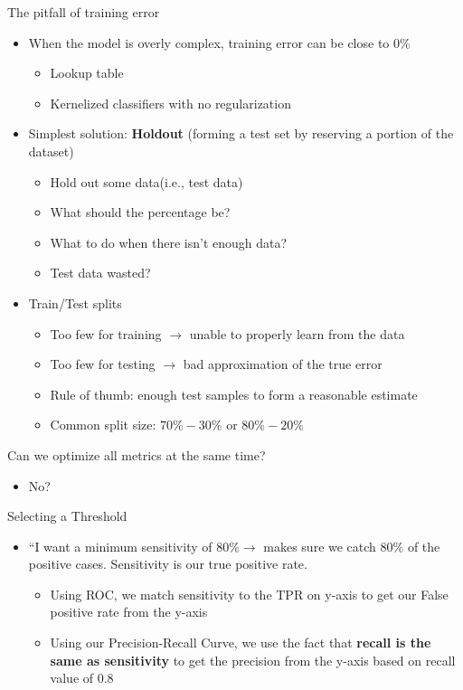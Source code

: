 \documentclass[10pt, oneside]{article}
\begin{document}
The pitfall of training error
\begin{itemize}
    \item When the model is overly complex, training error can be close to 0\%
    \begin{itemize}
        \item Lookup table
        \item Kernelized classifiers with no regularization
    \end{itemize}
    \item Simplest solution: \textbf{Holdout} (forming a test set by reserving a portion of the dataset)
    \begin{itemize}
        \item Hold out some data(i.e., test data)
        \item What should the percentage be? 
        \item What to do when there isn't enough data?
        \item Test data wasted?
    \end{itemize}
    \item Train/Test splits
    \begin{itemize}
        \item Too few for training $\rightarrow$ unable to properly learn from the data
        \item Too few for testing $\rightarrow$ bad approximation of the true error
        \item Rule of thumb: enough test samples to form a reasonable estimate
        \item Common split size: $70\%-30\%$ or $80\% - 20\%$
    \end{itemize}
\end{itemize}
Can we optimize all metrics at the same time?
\begin{itemize}
    \item No?
\end{itemize}
Selecting a Threshold
\begin{itemize}
    \item ``I want a minimum sensitivity of $80\%\rightarrow$ makes sure we catch $80\%$ of the positive cases. Sensitivity is our true positive rate.
    \begin{itemize}
        \item Using ROC, we match sensitivity to the TPR on y-axis to get our False positive rate from the y-axis
        \item Using our Precision-Recall Curve, we use the fact that \textbf{recall is the same as sensitivity} to get the precision from the y-axis based on recall value of 0.8
    \end{itemize}
\end{itemize}
\end{document}
